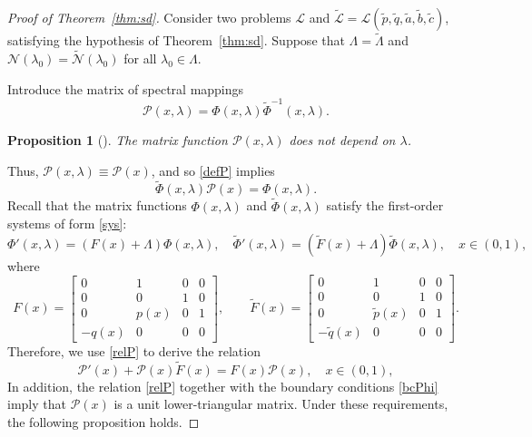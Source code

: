 \documentclass[a4paper,12pt]{article}
\newcommand{\la}{\lambda}
\theoremstyle{plain}
\numberwithin{equation}{section}
\newtheorem{prop}[thm]{Proposition}
\theoremstyle{definition}
\theoremstyle{remark}
\begin{document}
\begin{proof}[Proof of Theorem~\ref{thm:sd}]
Consider two problems $\mathcal L$ and $\tilde {\mathcal L} = \mathcal L(\tilde p, \tilde q, \tilde a, \tilde b, \tilde c)$, satisfying the hypothesis of Theorem~\ref{thm:sd}. Suppose that $\Lambda = \tilde \Lambda$ and $\mathcal N(\la_0) = \tilde{\mathcal N}(\la_0)$ for all $\la_0 \in \Lambda$.

Introduce the matrix of spectral mappings
\begin{equation} \label{defP}
\mathcal P(x, \la) = \Phi(x, \la) \tilde \Phi^{-1}(x, \la).
\end{equation}

\begin{prop}[{\cite[Lemma~9]{Bond22-alg}}]
The matrix function $\mathcal P(x,\la)$ does not depend on $\la$.
\end{prop}

Thus, $\mathcal P(x, \la) \equiv \mathcal P(x)$, and so \eqref{defP} implies
\begin{equation} \label{relP}
\tilde \Phi(x, \la) \mathcal P(x) = \Phi(x, \la).
\end{equation}
Recall that the matrix functions $\Phi(x, \la)$ and $\tilde \Phi(x, \la)$ satisfy the first-order systems of form \eqref{sys}: 
$$
\Phi'(x, \la) = (F(x) + \Lambda) \Phi(x, \la), \quad \tilde \Phi'(x, \la) = (\tilde F(x) + \Lambda) \tilde \Phi(x, \la), \quad x \in (0,1),
$$
where
\begin{equation} \label{structF}
F(x) = \begin{bmatrix}
            0 & 1 & 0 & 0 \\
            0 & 0 & 1 & 0 \\
            0 & p(x) & 0 & 1 \\
            -q(x) & 0 & 0 & 0
       \end{bmatrix}, \qquad
\tilde F(x) = \begin{bmatrix}
            0 & 1 & 0 & 0 \\
            0 & 0 & 1 & 0 \\
            0 & \tilde p(x) & 0 & 1 \\
            -\tilde q(x) & 0 & 0 & 0
       \end{bmatrix}.
\end{equation}
Therefore, we use \eqref{relP} to derive the relation
\begin{equation} \label{eqP}
\mathcal P'(x) + \mathcal P(x) \tilde F(x) = F(x) \mathcal P(x), \quad x \in (0,1),
\end{equation}
In addition, the relation \eqref{relP} together with the boundary conditions \eqref{bcPhi} imply that $\mathcal P(x)$ is a unit lower-triangular matrix. Under these requirements, the following proposition holds.


\end{proof}
\end{document}
